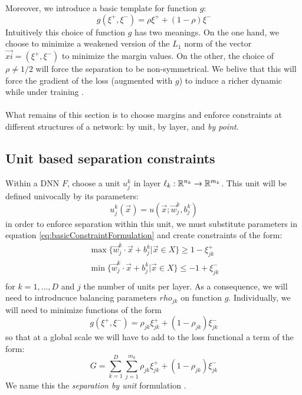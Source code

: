 Moreover, we introduce a basic template for function $g$:
\begin{equation}\label{eq:definitionOfRho}
    g(\xi^{+},\xi^{-}) = \rho\xi^{+}+(1-\rho)\xi^{-}
\end{equation}
Intuitively this choice of function $g$ has two meanings. On the one hand, we choose to minimize a weakened version of the $L_1$ norm of the vector $\vec{xi}=(\xi^{+},\xi^{-})$ to minimize the margin values. On the other, the choice of $\rho\neq 1/2$ will force the separation to be non-symmetrical. We belive that this will force the gradient of the loss (augmented with $g$) to induce a richer dynamic while under training \cite{LeCun06atutorial}. 
\\\\
What remains of this section is to choose margins and enforce constraints at different structures of a network: by unit, by layer, and \emph{by point}.

\subsection{Unit based separation constraints \SepUnit}
Within a \ReLU DNN $F$, choose a unit $u_j^k$ in layer $\ell_k:\mathbb{R}^{n_k}\rightarrow\mathbb{R}^{m_k}$. This unit will be defined univocally by its parameters:
\begin{equation}\label{eq:unitSepParameterWriting}
    u^k_j(\vec{x}) = u(\vec{x};\vec{w}^k_j,b^k_j)
\end{equation}
in order to enforce separation within this unit, we must substitute parameters in equation \ref{eq:basicConstraintFormulation} and create constraints of the form:
\begin{equation}
    \begin{array}{lcl}
    \max\{\vec{w}^k_j\cdot\vec{x}+b^k_j|\vec{x}\in X\}\geq 1-\xi^{+}_{jk}\\
    \min\{\vec{w}^k_j\cdot\vec{x}+b^k_j|\vec{x}\in X\}\leq -1+\xi^{-}_{jk}\\
\end{array}
\end{equation}
for $k=1,\ldots,D$ and $j$ the number of units per layer. As a consequence, we will need to introducuce balancing parameters $rho_{jk}$ on function $g$. Individually, we will need to minimize functions of the form
\begin{equation}
    g(\xi^{+},\xi^{-}) = \rho_{jk}\xi^{+}_{jk}+(1-\rho_{jk})\xi^{-}_{jk}
\end{equation}
so that at a global scale we will have to add to the loss functional a term of the form:
\begin{equation}\label{eq:constraintLossForUnitSeparation}
    G = \sum_{k=1}^{D}\sum_{j=1}^{m_k}\rho_{jk}\xi^{+}_{jk}+(1-\rho_{jk})\xi^{-}_{jk}
\end{equation}
We name this the \emph{separation by unit} formulation \SepUnit.

